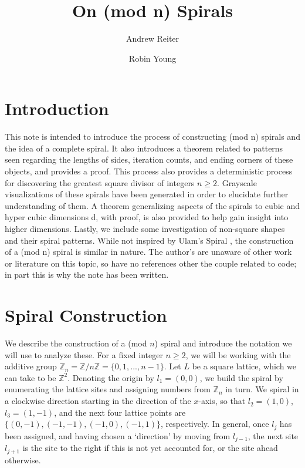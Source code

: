 \documentclass[11pt,reqno]{amsart}
\title{On (mod n) Spirals}
\author{Andrew Reiter}
\author{Robin Young}
\theoremstyle{mydef}
\def\ZZ{\mathbb{Z}}
\begin{document}
\maketitle
\section{Introduction}

This note is intended to introduce the process of constructing (mod n) spirals and the idea of a complete spiral.  It also introduces a theorem related to patterns seen regarding the lengths of sides, iteration counts, and ending corners of these objects, and provides a proof. This process also provides a deterministic process for discovering the greatest square divisor of integers $n \ge 2$. Grayscale visualizations of these spirals have been generated in order to elucidate further understanding of them. A theorem generalizing aspects of the spirals to cubic and hyper cubic dimensions d, with proof, is also provided to help gain insight into higher dimensions. Lastly, we include some investigation of non-square shapes and their spiral patterns. While not inspired by Ulam's Spiral \cite{Ulam}, the construction of  a (mod n) spiral is similar in nature. The author's are unaware of other work or literature on this topic, so have no references other the couple related to code; in part this is why the note has been written. 
\section{Spiral Construction}

We describe the construction of a (mod $n$) spiral and introduce the
notation we will use to analyze these.  For a fixed integer $n \ge 2$,
we will be working with the additive group
$\ZZ_n=\mathbb{Z}/n\mathbb{Z} = \{ 0, 1, ..., n-1 \}$.  Let $L$
be a square lattice, which we can take to be $\ZZ^2$.  Denoting
the origin by $l_1 = (0,0)$, we build the spiral by enumerating the
lattice sites and assigning numbers from $\mathbb{Z}_n$ in turn.  We
spiral in a clockwise direction starting in the direction of the
$x$-axis, so that $l_2 = (1,0)$, $l_3 = (1,-1)$, and the next four
lattice points are $\{(0, -1),(-1, -1),(-1, 0),(-1, 1)\}$,
respectively.  In general, once $l_j$ has been assigned, and having
chosen a `direction' by moving from $l_{j-1}$, the next site $l_{j+1}$
is the site to the right if this is not yet accounted for, or the site
ahead otherwise.
\end{document}
